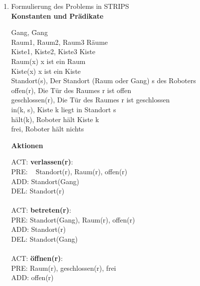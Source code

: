 \documentclass[a4paper,10pt]{article}
\begin{document}
\begin{enumerate}[~~a.)]
    \item Formulierung des Problems in STRIPS \\
    \textbf{Konstanten und Prädikate}
    \begin{tabbing}
    Gang,       \hspace{4cm}          \= Gang \\
    Raum1, Raum2, Raum3               \> Räume \\
    Kiste1, Kiste2, Kiste3            \> Kiste \\
    Raum(x)                           \> x ist ein Raum \\
    Kiste(x)                          \> x ist ein Kiste \\
    Standort(s),                      \> Der Standort (Raum oder Gang) s des Roboters \\
    offen(r),                         \> Die Tür des Raumes r ist offen \\
    geschlossen(r),                   \> Die Tür des Raumes r ist geschlossen \\
    in(k, s),                         \> Kiste k liegt in Standort s \\
    hält(k),                          \> Roboter hält Kiste k \\
    frei,                             \> Roboter hält nichts \\
    \end{tabbing} 
    \textbf{Aktionen}
    \begin{tabbing}
    ACT: \= \textbf{verlassen(r)}: \\
         \> PRE: ~ \= Standort(r), Raum(r), offen(r) \\
         \> ADD:   \> Standort(Gang) \\
         \> DEL:   \> Standort(r) \\
    \\
    ACT: \> \textbf{betreten(r)}: \\
         \> PRE:   \> Standort(Gang), Raum(r), offen(r) \\
         \> ADD:   \> Standort(r) \\
         \> DEL:   \> Standort(Gang) \\
    \\
    ACT: \> \textbf{öffnen(r)}: \\
         \> PRE:   \> Raum(r), geschlossen(r), frei \\
         \> ADD:   \> offen(r) \\

\end{tabbing}
\end{enumerate}
\end{document}
